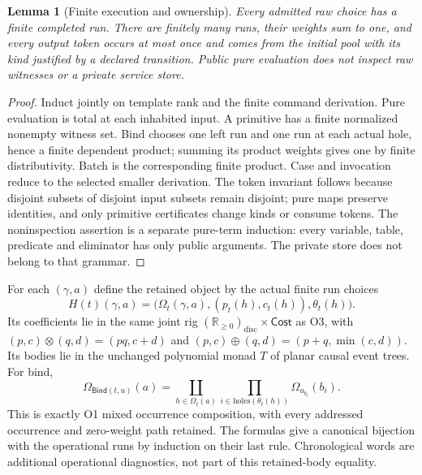 \documentclass[11pt,a4paper]{article}
\newtheorem{lemma}[theorem]{Lemma}
\theoremstyle{definition}
\newcommand{\Cost}{\mathsf{Cost}}
\newcommand{\Bind}{\mathsf{Bind}}
\begin{document}
\begin{lemma}[Finite execution and ownership]\label{lem:execution}
Every admitted raw choice has a finite completed run. There are finitely
many runs, their weights sum to one, and every output token occurs at most
once and comes from the initial pool with its kind justified by a declared
transition. Public pure evaluation does not inspect raw witnesses or a
private service store.
\end{lemma}
\begin{proof}
Induct jointly on template rank and the finite command derivation. Pure
evaluation is total at each inhabited input. A primitive has a finite
normalized nonempty witness set. Bind chooses one left run and one run at
each actual hole, hence a finite dependent product; summing its product
weights gives one by finite distributivity. Batch is the corresponding
finite product. Case and invocation reduce to the selected smaller
derivation. The token invariant follows because disjoint subsets of
disjoint input subsets remain disjoint; pure maps preserve identities,
and only primitive certificates change kinds or consume tokens. The
noninspection assertion is a separate pure-term induction: every variable,
table, predicate and eliminator has only public arguments. The private
store does not belong to that grammar.
\end{proof}

For each $(\gamma,a)$ define the retained object by the actual finite
run choices
\[
 H(t)(\gamma,a)=
 \bigl(\Omega_t(\gamma,a),(p_t(h),c_t(h)),\theta_t(h)\bigr).
\]
Its coefficients lie in the same joint rig
$(\mathbb R_{\ge0})_{\mathrm{disc}}\times\Cost$ as O3, with
$(p,c)\otimes(q,d)=(pq,c+d)$ and
$(p,c)\oplus(q,d)=(p+q,\min(c,d))$. Its bodies lie in the unchanged
polynomial monad $T$ of planar causal event trees. For bind,
\[
 \Omega_{\Bind(t,u)}(a)=
 \coprod_{h\in\Omega_t(a)}\prod_{i\in\mathrm{holes}(\theta_t(h))}
                   \Omega_{u_{b_i}}(b_i).
\]
This is exactly O1 mixed occurrence composition, with every addressed
occurrence and zero-weight path retained. The formulas give a canonical
bijection with the operational runs by induction on their last rule.
Chronological words are additional operational diagnostics, not part of
this retained-body equality.
\end{document}
